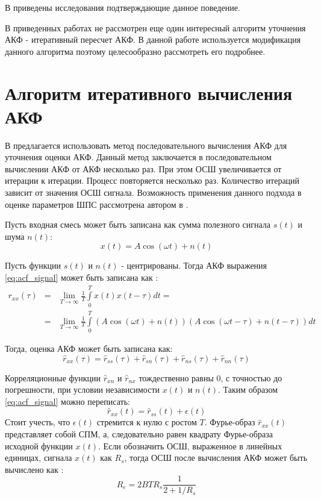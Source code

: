 В \cite{lacoss_spectral_est, chen_spectral_est, marple_1977} приведены исследования подтверждающие данное поведение.

В приведенных работах не рассмотрен еще один интересный алгоритм уточнения АКФ - итеративный пересчет АКФ. В данной работе используется
модификация данного алгоритма поэтому целесообразно рассмотреть его подробнее.

\section{Алгоритм итеративного вычисления АКФ}
\label{sec_ostanin}
В \cite{ostanin_akf} предлагается использовать метод последовательного вычисления АКФ для уточнения оценки АКФ. Данный метод
заключается в последовательном вычислении АКФ от АКФ несколько раз. При этом ОСШ увеличивается от итерации к итерации.
Процесс повторяется несколько раз. Количество итераций зависит от значения ОСШ сигнала. Возможность применения данного подхода в оценке параметров ШПС рассмотрена
автором в \cite{my_acf_cdma}.

Пусть входная смесь может быть записана как сумма полезного сигнала ${s(t)}$ и шума ${n(t)}$:
\begin{equation}
	\label{eq:acf_signal}
	x(t) = A \cos{(\omega t)} + n(t)
\end{equation}

Пусть функции ${s(t)}$ и ${n(t)}$ - центрированы. Тогда АКФ выражения \ref{eq:acf_signal} может быть записана как \cite{book_max}:
\begin{eqnarray}
	\label{eq:acf_rss_signal}
	r_{xx}(\tau)	& = & \lim_{T \to \infty} \frac{1}{T} \int \limits_0^T x(t)x(t-\tau)dt = \nonumber \\
			& = & \lim_{T \to \infty} \frac{1}{T} \int \limits_0^T (A \cos{(\omega t)} + n(t))(A \cos{(\omega t - \tau)} + n(t - \tau))dt
\end{eqnarray}

Тогда, оценка АКФ может быть записана как:
\begin{equation}
	\label{eq:acf_rss_signal_full}
	\hat{r}_{xx}(\tau)=\hat{r}_{ss}(\tau)+\hat{r}_{sn}(\tau)+\hat{r}_{ns}(\tau) + \hat{r}_{nn}(\tau)
\end{equation}

Корреляционные функции ${\hat{r}_{xn}}$ и ${\hat{r}_{nx}}$ тождественно равны 0, с точностью до погрешности, при условии независимости
${x(t)}$ и ${n(t)}$. Таким образом \ref{eq:acf_signal} можно переписать:
\begin{equation}
	\label{eq:acf_rss_signal_new}
	\hat{r}_{xx}(t) = \hat{r}_{ss}(t) + \epsilon (t)
\end{equation}
Стоит учесть, что ${\epsilon (t)}$ стремится к нулю с ростом ${T}$. Фурье-образ ${\hat{r}_{xx}(t)}$
представляет собой СПМ, а, следовательно равен квадрату Фурье-образа исходной функции ${x(t)}$.
Если обозначить ОСШ, выраженное в линейных единицах, сигнала ${x(t)}$ как ${R_s}$, тогда ОСШ после вычисления АКФ может быть вычислено
как \cite{book_max}:
\begin{equation}
	\label{eq:acf_snr_est}
	R_e=2BTR_s \frac{1}{2+1/R_s}
\end{equation}

